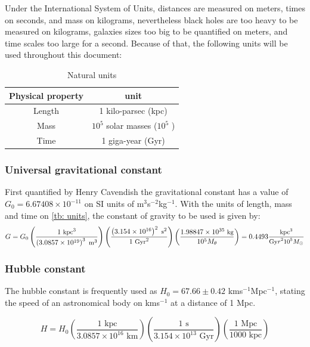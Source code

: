 		Under the International System of Units, distances are measured on meters, times on seconds, and mass on kilograms, nevertheless black holes are too heavy to be measured on kilograms, galaxies sizes too big to be quantified on meters, and time scales too large for a second. Because of that, the following units will be used throughout this document:
		\begin{table}[h]
			\centering
			\caption{Natural units}
			\label{tb: units}
			\begin{tabular}{c|c}
				\hline
				\textbf{Physical property} & \textbf{unit} \\
				\hline
				Length & 1 kilo-parsec (kpc) \\
				Mass & $10^5$ solar masses ($10^5$ \sm) \\
				Time & 1 giga-year (Gyr) \\
				\hline
			\end{tabular}
		\end{table}		
		
		\subsubsection{Universal gravitational constant}
			First quantified by Henry Cavendish the gravitational constant has a value of $G_0 = 6.67408\times10^{-11}$ on SI units of m$^3$s$^{-2}$kg$^{-1}$. With the units of length, mass and time on \autoref{tb: units}, the constant of gravity to be used is given by:
			\begin{equation}
				\small
				G = G_0 \left(\dfrac{1 \text{ kpc}^3}{\left(3.0857\times10^{19}\right)^3  \text{ m}^3}\right)\left(\dfrac{\left(3.154\times10^{16}\right)^2 \text{ s}^2}{1 \text{ Gyr}^2}\right)\left(\dfrac{1.98847\times10^{35} \text{ kg}}{10^5 M_\theta}\right) = 0.4493 \dfrac{\text{kpc$^3$}}{\text{Gy$r^210^5$$M_\odot$}}
			\end{equation}
			
		\subsubsection{Hubble constant}
		The hubble constant is frequently used as $H_0 = 67.66 \pm 0.42$ kms$^{-1}$Mpc$^{-1}$, stating the speed of an astronomical body on kms$^{-1}$ at a distance of 1 Mpc.
		
		\begin{equation}
			H = H_0 \left(\dfrac{1 \text{ kpc}}{3.0857\times10^{16} \text{ km}}\right)\left(\dfrac{1 \text{ s}}{3.154\times10^{13} \text{ Gyr}}\right)\left(\dfrac{1 \text{ Mpc}}{1000 \text{ kpc}}\right)
		\end{equation}
		
